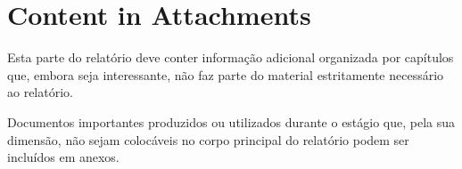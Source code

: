 \chapter{Content in Attachments} %
\label{chap:attachments}

Esta parte do relatório deve conter informação adicional organizada por capítulos que, embora seja interessante, não faz parte do material estritamente necessário ao relatório.

Documentos importantes produzidos ou utilizados durante o estágio que, pela sua dimensão, não sejam colocáveis no corpo principal do relatório podem ser incluídos em anexos.

